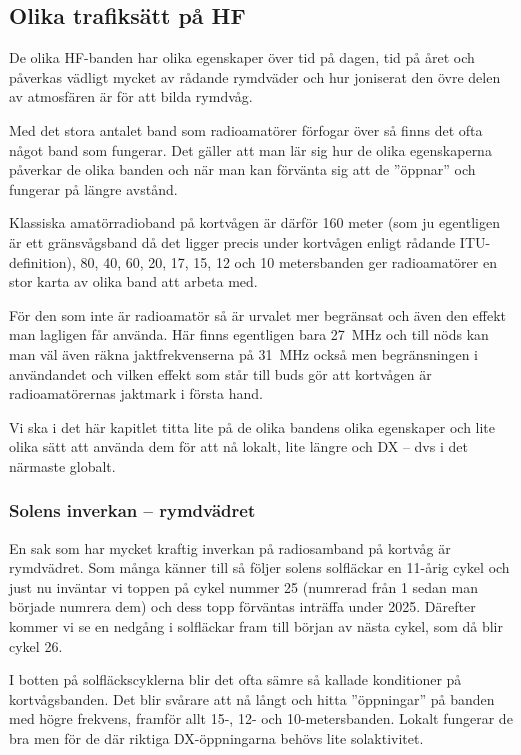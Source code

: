 \subsection{Olika trafiksätt på HF}

De olika HF-banden har olika egenskaper över tid på dagen, tid på året och påverkas vädligt mycket av rådande rymdväder och hur joniserat den övre delen av atmosfären är för att bilda rymdvåg.

Med det stora antalet band som radioamatörer förfogar över så finns det ofta något band som fungerar. Det gäller att man lär sig hur de olika egenskaperna påverkar de olika banden och när man kan förvänta sig att de ''öppnar'' och fungerar på längre avstånd.

Klassiska amatörradioband på kortvågen är därför 160 meter (som ju egentligen är ett gränsvågsband då det ligger precis under kortvågen enligt rådande ITU-definition), 80, 40, 60, 20, 17, 15, 12 och 10 metersbanden ger radioamatörer en stor karta av olika band att arbeta med.

För den som inte är radioamatör så är urvalet mer begränsat och även den effekt man lagligen får använda. Här finns egentligen bara 27~MHz och till nöds kan man väl även räkna jaktfrekvenserna på 31~MHz också men begränsningen i användandet och vilken effekt som står till buds gör att kortvågen är radioamatörernas jaktmark i första hand.

Vi ska i det här kapitlet titta lite på de olika bandens olika egenskaper och lite olika sätt att använda dem för att nå lokalt, lite längre och DX -- dvs i det närmaste globalt.

\subsubsection{Solens inverkan -- rymdvädret}

En sak som har mycket kraftig inverkan på radiosamband på kortvåg är rymdvädret. Som många känner till så följer solens solfläckar en 11-årig cykel och just nu inväntar vi toppen på cykel nummer 25 (numrerad från 1 sedan man började numrera dem) och dess topp förväntas inträffa under 2025. Därefter kommer vi se en nedgång i solfläckar fram till början av nästa cykel, som då blir cykel 26. 

I botten på solfläckscyklerna blir det ofta sämre så kallade konditioner på kortvågsbanden. Det blir svårare att nå långt och hitta ''öppningar'' på banden med högre frekvens, framför allt 15-, 12- och 10-metersbanden. Lokalt fungerar de bra men för de där riktiga DX-öppningarna behövs lite solaktivitet.

